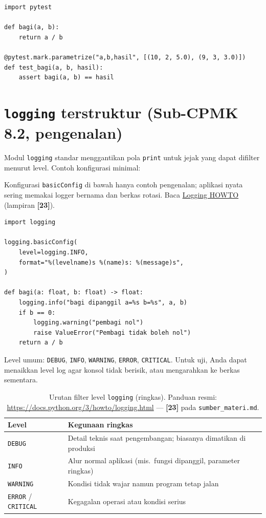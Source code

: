 \documentclass[../main.tex]{subfiles}
\begin{document}
\begin{lstlisting}[caption=pytest parametrizasi sederhana]
import pytest

def bagi(a, b):
    return a / b

@pytest.mark.parametrize("a,b,hasil", [(10, 2, 5.0), (9, 3, 3.0)])
def test_bagi(a, b, hasil):
    assert bagi(a, b) == hasil
\end{lstlisting}

\section{\texttt{logging} terstruktur (Sub-CPMK 8.2, pengenalan)}

Modul \texttt{logging} standar menggantikan pola \texttt{print} untuk jejak yang dapat difilter menurut level. Contoh konfigurasi minimal:

\noindent Konfigurasi \texttt{basicConfig} di bawah hanya contoh pengenalan; aplikasi nyata sering memakai logger bernama dan berkas rotasi. Baca \href{https://docs.python.org/3/howto/logging.html}{Logging HOWTO} (lampiran \textbf{[23]}).

\begin{lstlisting}[caption=logging dasar]
import logging

logging.basicConfig(
    level=logging.INFO,
    format="%(levelname)s %(name)s: %(message)s",
)

def bagi(a: float, b: float) -> float:
    logging.info("bagi dipanggil a=%s b=%s", a, b)
    if b == 0:
        logging.warning("pembagi nol")
        raise ValueError("Pembagi tidak boleh nol")
    return a / b
\end{lstlisting}

\noindent Level umum: \texttt{DEBUG}, \texttt{INFO}, \texttt{WARNING}, \texttt{ERROR}, \texttt{CRITICAL}. Untuk uji, Anda dapat menaikkan level log agar konsol tidak berisik, atau mengarahkan ke berkas sementara.

\begin{table}[htbp]
\centering
\small
\begin{tabular}{|l|>{\raggedright\arraybackslash}p{9.8cm}|}
\hline
\textbf{Level} & \textbf{Kegunaan ringkas} \\
\hline
\texttt{DEBUG} & Detail teknis saat pengembangan; biasanya dimatikan di produksi \\
\hline
\texttt{INFO} & Alur normal aplikasi (mis.\ fungsi dipanggil, parameter ringkas) \\
\hline
\texttt{WARNING} & Kondisi tidak wajar namun program tetap jalan \\
\hline
\texttt{ERROR} / \texttt{CRITICAL} & Kegagalan operasi atau kondisi serius \\
\hline
\end{tabular}
\caption{Urutan filter level \texttt{logging} (ringkas). Panduan resmi: \protect\url{https://docs.python.org/3/howto/logging.html} --- \textbf{[23]} pada \texttt{sumber\_materi.md}.}
\label{tab:logging-level}
\end{table}
\end{document}
